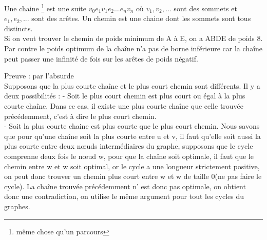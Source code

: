 \begin{solution}
Une chaine \footnote{même chose qu'un parcours} est une suite $v_0e_1v_1e_2...e_nv_n $ où $v_1,v_2,...$ sont des sommets et $e_1,e_2,...$ sont des arêtes. 
Un chemin est une chaine dont les sommets sont tous distincts.\\

Si on veut trouver le chemin de poids minimum de A à E, on a ABDE de poids $8$. Par contre le poids optimum de la chaîne n'a pas de borne inférieure car la chaîne peut passer une infinité de fois sur les arêtes de poids négatif.\\
\begin{figure}[h!]
\centering
{}
\end{figure}

Preuve : par l'absurde\\
Supposons que la plus courte chaîne et le plus court chemin sont différents. Il y a deux possibilités :
- Soit le plus court chemin est plus court ou égal à la plus courte chaîne. Dans ce cas, il existe une plus courte chaîne que celle trouvée précédemment, c'est à dire le plus court chemin.\\
- Soit la plus courte chaine est plus courte que le plus court chemin. Nous savons que pour qu'une chaîne soit la plus courte entre u et v, il faut qu'elle soit aussi la plus courte entre deux nœuds intermédiaires du graphe, supposons que le cycle comprenne deux fois le nœud w, pour que la chaîne soit optimale, il faut que le chemin entre w et w soit optimal, or le cycle a une longueur strictement positive, on peut donc trouver un chemin plus court entre w et w de taille 0(ne pas faire le cycle). La chaîne trouvée précédemment n' est donc pas optimale, on obtient donc une contradiction, on utilise le même argument pour tout les cycles du graphes.
\end{solution}



